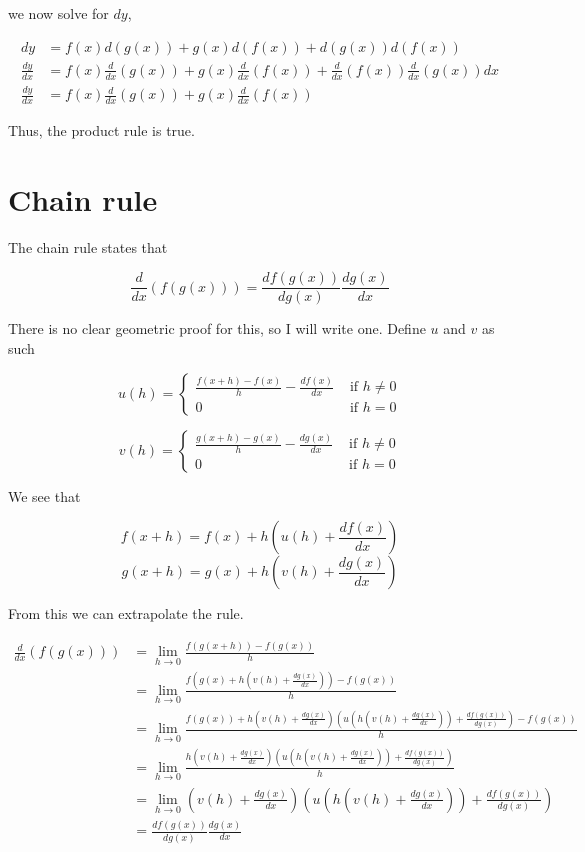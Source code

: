 \documentclass[a4paper,12pt,oneside]{book}
\begin{document}
\noindent we now solve for $dy$,

$$\begin{aligned}
dy&=f(x)d(g(x))+g(x)d(f(x))+d(g(x))d(f(x))\\
\frac{dy}{dx}&=f(x)\frac{d}{dx}(g(x))+g(x)\frac{d}{dx}(f(x))+\frac{d}{dx}(f(x))\frac{d}{dx}(g(x))dx\\
\frac{dy}{dx}&=f(x)\frac{d}{dx}(g(x))+g(x)\frac{d}{dx}(f(x))
\end{aligned}$$

\noindent Thus, the product rule is true.

\section{Chain rule}

The chain rule states that

$$\frac{d}{dx}(f(g(x)))=\frac{df(g(x))}{dg(x)}\frac{dg(x)}{dx}$$

\noindent There is no clear geometric proof for this, so I will write one. Define $u$ and $v$ as such

$$u(h)=\left\{ {\begin{array}{*{20}{l}}{\displaystyle \frac{{f( {x + h}) - f( x)}}{h} - \frac{df(x)}{dx}}&{{\mbox{  if }}h \ne 0}\\0&{{\mbox{  if }}h = 0}\end{array}} \right.$$

$$v(h)=\left\{ {\begin{array}{*{20}{l}}{\displaystyle \frac{{g( {x + h}) - g( x)}}{h} - \frac{dg(x)}{dx}}&{{\mbox{  if }}h \ne 0}\\0&{{\mbox{  if }}h = 0}\end{array}} \right.$$

\noindent We see that

$$f(x+h)=f(x)+h\left(u(h)+\frac{df(x)}{dx}\right)$$
$$g(x+h)=g(x)+h\left(v(h)+\frac{dg(x)}{dx}\right)$$

\noindent From this we can extrapolate the rule.

$$\begin{aligned}
\frac{d}{dx}(f(g(x)))&=\lim_{h\to 0}\frac{f(g(x+h))-f(g(x))}{h}\\
&=\lim_{h\to 0}\frac{f(g(x)+h\left(v(h)+\frac{dg(x)}{dx}\right))-f(g(x))}{h}\\
&=\lim_{h\to 0}\frac{f(g(x))+h\left(v(h)+\frac{dg(x)}{dx}\right)\left(u(h\left(v(h)+\frac{dg(x)}{dx}\right))+\frac{df(g(x))}{dg(x)}\right)-f(g(x))}{h}\\
&=\lim_{h\to 0}\frac{h\left(v(h)+\frac{dg(x)}{dx}\right)\left(u(h\left(v(h)+\frac{dg(x)}{dx}\right))+\frac{df(g(x))}{dg(x)}\right)}{h}\\
&=\lim_{h\to 0}\left(v(h)+\frac{dg(x)}{dx}\right)\left(u(h\left(v(h)+\frac{dg(x)}{dx}\right))+\frac{df(g(x))}{dg(x)}\right)\\
&=\frac{df(g(x))}{dg(x)}\frac{dg(x)}{dx}
\end{aligned}$$
\end{document}
